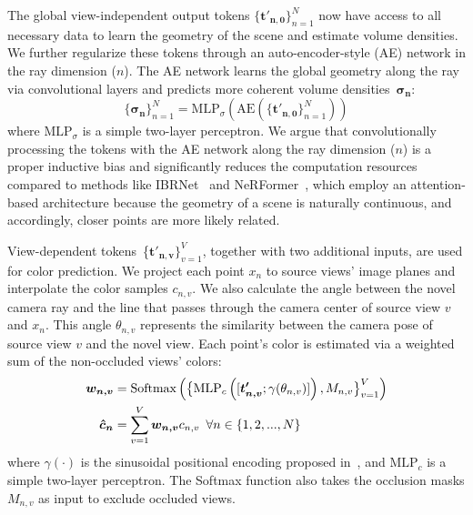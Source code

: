 The global view-independent output tokens $\{\boldsymbol{t'_{n,0}}\}_{n=1}^{N}$ now have access to all necessary data to learn the geometry of the scene and estimate volume densities. We further regularize these tokens through an auto-encoder-style (AE) network in the ray dimension ($n$). The AE network learns the global geometry along the ray via convolutional layers and predicts more coherent volume densities~$\boldsymbol{\sigma_{n}}$:
\begin{equation}
    \{\boldsymbol{\sigma_{n}}\}_{n=1}^{N} = \text{MLP}_{\sigma} \left( \text{AE} \left(\{\boldsymbol{t'_{n,0}}\}_{n=1}^{N} \right) \right)
\end{equation}
where $\text{MLP}_{\sigma}$ is a simple two-layer perceptron. We argue that convolutionally processing the tokens with the AE network along the ray dimension ($n$) is a proper inductive bias and significantly reduces the computation resources compared to methods like IBRNet~\cite{wang2021ibrnet} and NeRFormer~\cite{reizenstein2021common}, which employ an attention-based architecture because the geometry of a scene is naturally continuous, and accordingly, closer points are more likely related.

View-dependent tokens~\{$\boldsymbol{t'_{n,v}}\}_{v=1}^{V}$, together with two additional inputs, are used for color prediction. We project each point $x_{n}$ to source views' image planes and interpolate the color samples $c_{n,v}$. We also calculate the angle between the novel camera ray and the line that passes through the camera center of source view $v$ and $x_{n}$. This angle $\theta_{n,v}$ represents the similarity between the camera pose of source view $v$ and the novel view. Each point's color is estimated via a weighted sum of the non-occluded views' colors: 
\begin{align}
\boldsymbol{w_{n,v}} &= \text{Softmax} \left ( \big \{\text{MLP}_c \left ([\boldsymbol{t'_{n,v}}; \gamma(\theta_{n,v})] \right ),M_{n,v} \big \}_{v=1}^{V} \right ) \notag
\\
\boldsymbol{\hat{c}_{n}} &= \sum_{v=1}^{V} \boldsymbol{w_{n,v}}c_{n,v} \phantom{0} \forall n \in \{1, 2, ..., N\}
\end{align}
where $\gamma(\cdot)$ is the sinusoidal positional encoding proposed in~\cite{mildenhall2020nerf}, and $\text{MLP}_{c}$ is a simple two-layer perceptron. The Softmax function also takes the occlusion masks $M_{n,v}$ as input to exclude occluded views.

